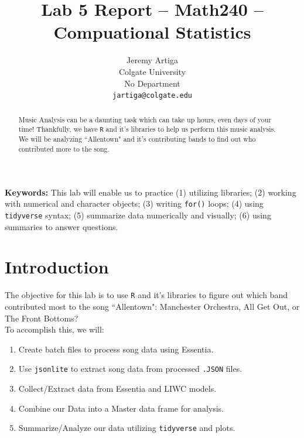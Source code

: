 \documentclass{article}\usepackage[]{graphicx}\usepackage[]{xcolor}
\begin{document}
\vspace{-1in}

\title{Lab 5 Report -- Math240 -- Compuational Statistics}
\author{
  Jeremy Artiga \\
  Colgate University \\
  No Department \\
  {\tt{jartiga@colgate.edu}}
}

\date{}

\maketitle

\begin{multicols}{2}
\begin{abstract}
Music Analysis can be a daunting task which can take up hours, even days of your time! Thankfully, 
we have \texttt{R} and it's libraries to help us perform this music analysis. We will be analyzing
``Allentown" and it's contributing bands to find out who contributed more to the song.
\end{abstract}

\textbf{Keywords:} This lab will enable us to practice (1) utilizing libraries; (2) working with numerical
and character objects; (3) writing \texttt{for()} loops; (4) using \texttt{tidyverse} syntax; (5) summarize
data numerically and visually; (6) using \\ summaries to answer questions.

\section{Introduction}
The objective for this lab is to use \texttt{R} and it's libraries to figure out which band contributed most to the song ``Allentown": Manchester Orchestra, All Get Out, or The Front Bottoms? \\

\noindent To accomplish this, we will:
\begin{enumerate}
  \item Create batch files to process song data using Essentia.
  \item Use \texttt{jsonlite} \citep{jsonlite} to extract song data from processed \texttt{.JSON}
  files.
  \item Collect/Extract data from Essentia \citep{bogdanov2013essentia} and LIWC \citep{liwc22} models.
  \item Combine our Data into a Master data frame for analysis.
  \item Summarize/Analyze our data utilizing \texttt{tidyverse} \citep{tidyverse} and plots.
\end{enumerate}


\end{multicols}
\end{document}
